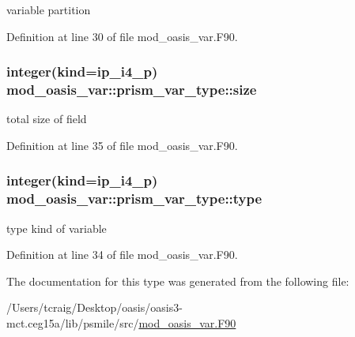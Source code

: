variable partition 



Definition at line 30 of file mod\+\_\+oasis\+\_\+var.\+F90.

\hypertarget{structmod__oasis__var_1_1prism__var__type_a13dac48e592591a9e06999aadaf1e6b7}{
\subsubsection[{size}]{\setlength{\rightskip}{0pt plus 5cm}integer(kind=ip\+\_\+i4\+\_\+p) mod\+\_\+oasis\+\_\+var\+::prism\+\_\+var\+\_\+type\+::size\hspace{0.3cm}{\ttfamily [private]}}}\label{structmod__oasis__var_1_1prism__var__type_a13dac48e592591a9e06999aadaf1e6b7}


total size of field 



Definition at line 35 of file mod\+\_\+oasis\+\_\+var.\+F90.

\hypertarget{structmod__oasis__var_1_1prism__var__type_a944549d5fb1aebecc59ca5dbff9b3222}{
\subsubsection[{type}]{\setlength{\rightskip}{0pt plus 5cm}integer(kind=ip\+\_\+i4\+\_\+p) mod\+\_\+oasis\+\_\+var\+::prism\+\_\+var\+\_\+type\+::type\hspace{0.3cm}{\ttfamily [private]}}}\label{structmod__oasis__var_1_1prism__var__type_a944549d5fb1aebecc59ca5dbff9b3222}


type kind of variable 



Definition at line 34 of file mod\+\_\+oasis\+\_\+var.\+F90.



The documentation for this type was generated from the following file\+:\begin{DoxyCompactItemize}
\item 
/\+Users/tcraig/\+Desktop/oasis/oasis3-\/mct.\+ceg15a/lib/psmile/src/\hyperlink{mod__oasis__var_8_f90}{mod\+\_\+oasis\+\_\+var.\+F90}\end{DoxyCompactItemize}
